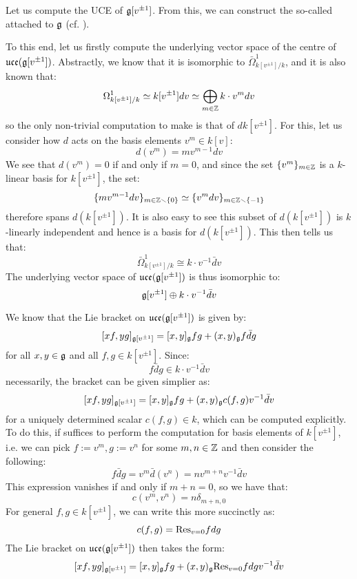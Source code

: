         \begin{example} \label{example: affine_lie_algebras_centres}
            Let us compute the UCE of $\mathfrak{g}[v^{\pm 1}]$. From this, we can construct the so-called  attached to $\mathfrak{g}$ (cf. \cite[Chapter 7]{kac_infinite_dimensional_lie_algebras}). 

            To this end, let us firstly compute the underlying vector space of the centre of $\mathfrak{uce}(\mathfrak{g}[v^{\pm 1}])$. Abstractly, we know that it is isomorphic to $\bar{\Omega}^1_{k[v^{\pm 1}]/k}$, and it is also known that:
                $$\Omega^1_{k[v^{\pm 1}]/k} \simeq k[v^{\pm 1}] dv \simeq \bigoplus_{m \in \mathbb{Z}} k \cdot v^m dv$$
            so the only non-trivial computation to make is that of $d k[v^{\pm 1}]$. For this, let us consider how $d$ acts on the basis elements $v^m \in k[v]$:
                $$d(v^m) = m v^{m - 1} dv$$
            We see that $d(v^m) = 0$ if and only if $m = 0$, and since the set $\{v^m\}_{m \in \mathbb{Z}}$ is a $k$-linear basis for $k[v^{\pm 1}]$, the set:
                $$\{m v^{m - 1} dv\}_{m \in \mathbb{Z} \smallsetminus \{0\}} \simeq \{v^m dv\}_{m \in \mathbb{Z} \smallsetminus \{-1\}}$$
            therefore spans $d(k[v^{\pm 1}])$. It is also easy to see this subset of $d(k[v^{\pm 1}])$ is $k$-linearly independent and hence is a basis for $d(k[v^{\pm 1}])$. This then tells us that:
                $$\bar{\Omega}^1_{k[v^{\pm 1}]/k} \cong k \cdot v^{-1} \bar{d}v$$
            The underlying vector space of $\mathfrak{uce}(\mathfrak{g}[v^{\pm 1}])$ is thus isomorphic to:
                $$\mathfrak{g}[v^{\pm 1}] \oplus k \cdot v^{-1} \bar{d}v$$

            We know that the Lie bracket on $\mathfrak{uce}(\mathfrak{g}[v^{\pm 1}])$ is given by:
                $$[x f, y g]_{\mathfrak{g}[v^{\pm 1}]} = [x, y]_{\mathfrak{g}} fg + (x, y)_{\mathfrak{g}} f \bar{d}g$$
            for all $x, y \in \mathfrak{g}$ and all $f, g \in k[v^{\pm 1}]$. Since:
                $$f \bar{d}g \in k \cdot v^{-1} \bar{d}v$$
            necessarily, the bracket can be given simplier as:
                $$[x f, y g]_{\mathfrak{g}[v^{\pm 1}]} = [x, y]_{\mathfrak{g}} fg + (x, y)_{\mathfrak{g}} c(f, g) v^{-1} \bar{d}v$$
            for a uniquely determined scalar $c(f, g) \in k$, which can be computed explicitly. To do this, if suffices to perform the computation for basis elements of $k[v^{\pm 1}]$, i.e. we can pick $f := v^m, g := v^n$ for some $m, n \in \mathbb{Z}$ and then consider the following:
                $$f \bar{d}g = v^m \bar{d}(v^n) = n v^{m + n} v^{-1} \bar{d}v$$
            This expression vanishes if and only if $m + n = 0$, so we have that:
                $$c(v^m, v^n) = n \delta_{m + n, 0}$$
            For general $f, g \in k[v^{\pm 1}]$, we can write this more succinctly as:
                $$c(f, g) = \mathrm{Res}_{v = 0} fdg$$
            The Lie bracket on $\mathfrak{uce}(\mathfrak{g}[v^{\pm 1}])$ then takes the form:
                $$[x f, y g]_{\mathfrak{g}[v^{\pm 1}]} = [x, y]_{\mathfrak{g}} fg + (x, y)_{\mathfrak{g}} \mathrm{Res}_{v = 0} f dg v^{-1} \bar{d}v$$
                

\end{example}

